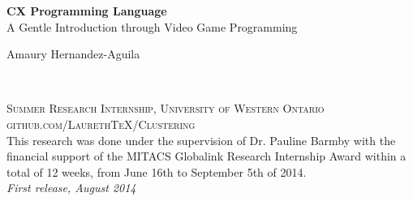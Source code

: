 \documentclass[11pt,fleqn,openany]{book} %
\begin{document}

\begingroup
\thispagestyle{empty}
\centering
\vspace*{5cm}
\par\normalfont\fontsize{35}{35}\sffamily\selectfont
\textbf{CX Programming Language}\\
{\LARGE A Gentle Introduction through Video Game Programming}\par %
\vspace*{1cm}
{\Huge Amaury Hernandez-Aguila}\par %
\endgroup


\newpage
~\vfill
\thispagestyle{empty}


\noindent \textsc{Summer Research Internship, University of Western Ontario}\\

\noindent \textsc{github.com/LaurethTeX/Clustering}\\ %

\noindent This research was done under the supervision of Dr. Pauline Barmby with the financial support of the MITACS Globalink Research Internship Award within a total of 12 weeks, from June 16th to September 5th of 2014.\\ %

\noindent \textit{First release, August 2014} %



\pagestyle{empty} %
\end{document}
